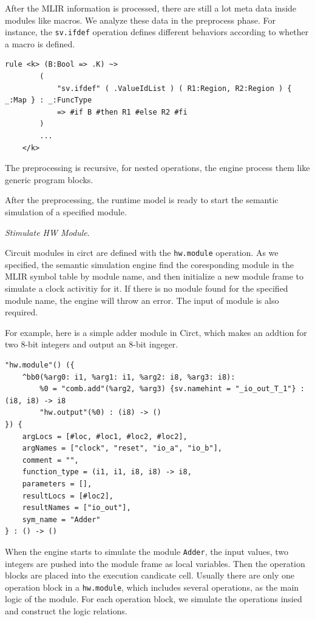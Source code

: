 After the MLIR information is processed, there are still a lot meta data inside modules like macros. We analyze these data in the preprocess phase. For instance, the \verb|sv.ifdef| operation defines different behaviors according to whether a macro is defined.
\begin{lstlisting}[basicstyle=\scriptsize\ttfamily]
rule <k> (B:Bool => .K) ~> 
        (
            "sv.ifdef" ( .ValueIdList ) ( R1:Region, R2:Region ) { _:Map } : _:FuncType
            => #if B #then R1 #else R2 #fi
        )
        ...
    </k>
\end{lstlisting}

The preprocessing is recursive, for nested operations, the engine process them like generic program blocks.

After the preprocessing, the runtime model is ready to start the semantic simulation of a specified module.

\smallskip
\textit{Stimulate HW Module}.

Circuit modules in circt are defined with the \verb|hw.module| operation. As we specified, the semantic simulation engine find the coresponding module in the MLIR symbol table by module name, and then initialize a new module frame to simulate a clock activitiy for it. If there is no module found for the specified module name, the engine will throw an error. The input of module is also required.

For example, here is a simple adder module in Circt, which makes an addtion for two 8-bit integers and output an 8-bit ingeger.

\begin{lstlisting}[basicstyle=\scriptsize\ttfamily]
"hw.module"() ({
    ^bb0(%arg0: i1, %arg1: i1, %arg2: i8, %arg3: i8):
        %0 = "comb.add"(%arg2, %arg3) {sv.namehint = "_io_out_T_1"} : (i8, i8) -> i8
        "hw.output"(%0) : (i8) -> ()
}) {
    argLocs = [#loc, #loc1, #loc2, #loc2], 
    argNames = ["clock", "reset", "io_a", "io_b"], 
    comment = "", 
    function_type = (i1, i1, i8, i8) -> i8, 
    parameters = [], 
    resultLocs = [#loc2], 
    resultNames = ["io_out"], 
    sym_name = "Adder"
} : () -> ()
\end{lstlisting}

When the engine starts to simulate the module \verb|Adder|, the input values, two integers are pushed into the module frame as local variables. Then the operation blocks are placed into the execution candicate cell. Usually there are only one operation block in a \verb|hw.module|, which includes several operations, as the main logic of the module. For each operation block, we simulate the operations insied and construct the logic relations.

